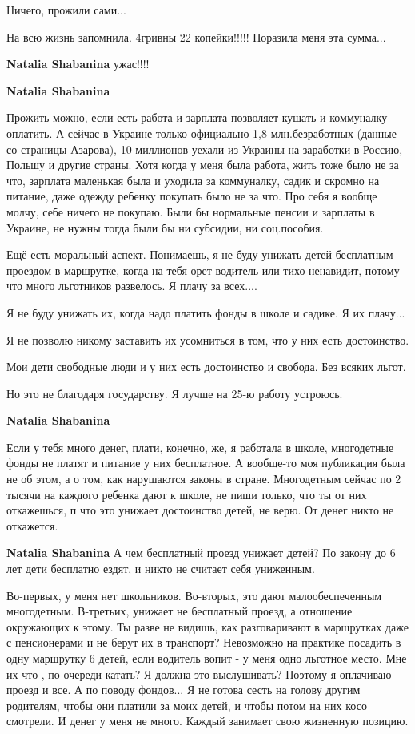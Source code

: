 \begin{itemize}
\begin{itemize}
Ничего, прожили сами...

На всю жизнь запомнила. 4гривны 22 копейки!!!!! Поразила меня эта сумма...

\textbf{Natalia Shabanina} ужас!!!!

\textbf{Natalia Shabanina} 

Прожить можно, если есть работа и зарплата позволяет кушать и коммуналку
оплатить. А сейчас в Украине только официально 1,8 млн.безработных (данные со
страницы Азарова), 10 миллионов уехали из Украины на заработки в Россию, Польшу
и другие страны. Хотя когда у меня была работа, жить тоже было не за что,
зарплата маленькая была и уходила за коммуналку, садик и скромно на питание,
даже одежду ребенку покупать было не за что. Про себя я вообще молчу, себе
ничего не покупаю. Были бы нормальные пенсии и зарплаты в Украине, не нужны
тогда были бы ни субсидии, ни соц.пособия.



Ещё есть моральный аспект. Понимаешь, я не буду унижать детей бесплатным
проездом в маршрутке, когда на тебя орет водитель или тихо ненавидит, потому
что много льготников развелось. Я плачу за всех....

Я не буду унижать их, когда надо платить фонды в школе и садике. Я их плачу...

Я не позволю никому заставить их усомниться в том, что у них есть достоинство.

Мои дети свободные люди и у них есть достоинство и свобода. Без всяких льгот.

Но это не благодаря государству. Я лучше на 25-ю работу устроюсь.

\textbf{Natalia Shabanina} 

Если у тебя много денег, плати, конечно, же, я работала в школе, многодетные
фонды не платят и питание у них бесплатное. А вообще-то моя публикация была не
об этом, а о том, как нарушаются законы в стране. Многодетным сейчас по 2
тысячи на каждого ребенка дают к школе, не пиши только, что ты от них
откажешься, п что это унижает достоинство детей, не верю. От денег никто не
откажется.


\textbf{Natalia Shabanina} А чем бесплатный проезд унижает детей? По закону до 6 лет дети бесплатно ездят, и никто не считает себя униженным.


Во-первых, у меня нет школьников. Во-вторых, это дают малообеспеченным
многодетным. В-третьих, унижает не бесплатный проезд, а отношение окружающих к
этому. Ты разве не видишь, как разговаривают в маршрутках даже с пенсионерами и
не берут их в транспорт? Невозможно на практике посадить в одну маршрутку 6
детей, если водитель вопит - у меня одно льготное место. Мне их что , по
очереди катать? Я должна это выслушивать? Поэтому я оплачиваю проезд и все. А
по поводу фондов... Я не готова сесть на голову другим родителям, чтобы они
платили за моих детей, и чтобы потом на них косо смотрели. И денег у меня не
много. Каждый занимает свою жизненную позицию.


\end{itemize}
\end{itemize}
